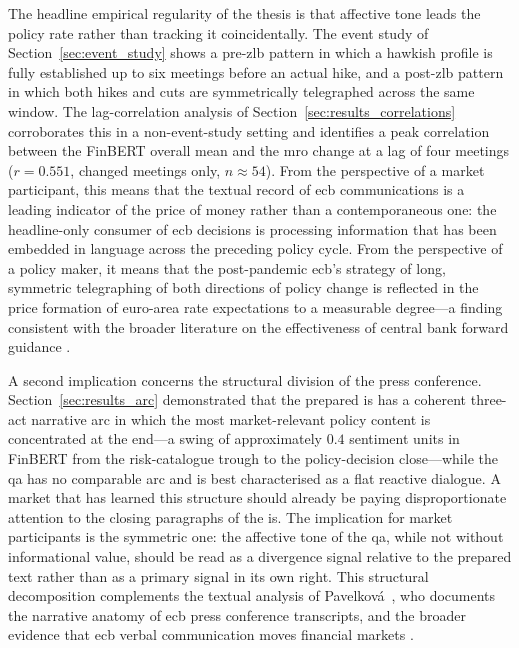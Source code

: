 The headline empirical regularity of the thesis is that affective tone leads the policy rate rather than tracking it coincidentally. The event study of Section~\ref{sec:event_study} shows a pre-\gls{zlb} pattern in which a hawkish profile is fully established up to six meetings before an actual hike, and a post-\gls{zlb} pattern in which both hikes and cuts are symmetrically telegraphed across the same window. The lag-correlation analysis of Section~\ref{sec:results_correlations} corroborates this in a non-event-study setting and identifies a peak correlation between the FinBERT overall mean and the \gls{mro} change at a lag of four meetings ($r = 0.551$, changed meetings only, $n \approx 54$). From the perspective of a market participant, this means that the textual record of \gls{ecb} communications is a leading indicator of the price of money rather than a contemporaneous one: the headline-only consumer of \gls{ecb} decisions is processing information that has been embedded in language across the preceding policy cycle. From the perspective of a policy maker, it means that the post-pandemic \gls{ecb}'s strategy of long, symmetric telegraphing of both directions of policy change is reflected in the price formation of euro-area rate expectations to a measurable degree---a finding consistent with the broader literature on the effectiveness of central bank forward guidance \cite{blinder2008central, NBERw11898}.

A second implication concerns the structural division of the press conference. Section~\ref{sec:results_arc} demonstrated that the prepared \gls{is} has a coherent three-act narrative arc in which the most market-relevant policy content is concentrated at the end---a swing of approximately $0.4$ sentiment units in FinBERT from the risk-catalogue trough to the policy-decision close---while the \gls{qa} has no comparable arc and is best characterised as a flat reactive dialogue. A market that has learned this structure should already be paying disproportionate attention to the closing paragraphs of the \gls{is}. The implication for market participants is the symmetric one: the affective tone of the \gls{qa}, while not without informational value, should be read as a divergence signal relative to the prepared text rather than as a primary signal in its own right. This structural decomposition complements the textual analysis of Pavelkov\'{a}~\cite{ECB_WP2742}, who documents the narrative anatomy of \gls{ecb} press conference transcripts, and the broader evidence that \gls{ecb} verbal communication moves financial markets \cite{Istrefi2021ECB}.

